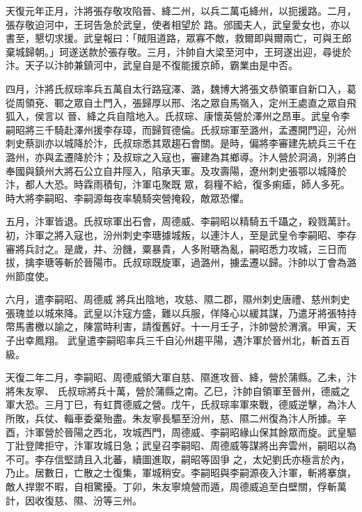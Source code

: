 \begin{pinyinscope}
 天復元年正月，汴將張存敬攻陷晉、絳二州，以兵二萬屯絳州，以扼援路。二月，張存敬迫河中，王珂告急於武皇，使者相望於
 路。邠國夫人，武皇愛女也，亦以書至，懇切求援。武皇報曰：「賊阻道路，眾寡不敵，救爾即與爾兩亡，可與王郎棄城歸朝。」珂遂送款於張存敬。三月，汴帥自大梁至河中，王珂遂出迎，尋徙於汴。天子以汴帥兼鎮河中，武皇自是不復能援京師，霸業由是中否。



 四月，汴將氏叔琮率兵五萬自太行路寇澤、潞，魏博大將張文恭領軍自新口入，葛從周領兗、鄆之眾自土門入，張歸厚以邢、洺之眾自馬嶺入，定州王處直之眾自飛狐入，侯言以
 晉、絳之兵自陰地入。氏叔琮、康懷英營於澤州之昂車。武皇令李嗣昭將三千騎赴澤州援李存璋，而歸賀德倫。氏叔琮軍至潞州，孟遷開門迎，沁州刺史蔡訓亦以城降於汴，氏叔琮悉其眾趨石會關。是時，偏將李審建先統兵三千在潞州，亦與孟遷降於汴；及叔琮之入寇也，審建為其鄉導。汴人營於洞渦，別將白奉國與鎮州大將石公立自井陘入，陷承天軍。及攻壽陽，遼州刺史張鄂以城降於汴，都人大恐。時霖雨積旬，汴軍屯聚既
 眾，芻糧不給，復多痢瘧，師人多死。時大將李嗣昭、李嗣源每夜率驍騎突營掩殺，敵眾恐懼。



 五月，汴軍皆退。氏叔琮軍出石會，周德威、李嗣昭以精騎五千躡之，殺戮萬計。初，汴軍之將入寇也，汾州刺史李瑭據城叛，以連汴人，至是武皇令李嗣昭、李存審將兵討之。是歲，并、汾饑，粟暴貴，人多附瑭為亂，嗣昭悉力攻城，三日而拔，擒李瑭等斬於晉陽市。氏叔琮既旋軍，過潞州，擄孟遷以歸。汴帥以丁會為潞州節度使。


六月，遣李嗣昭、周德威
 將兵出陰地，攻慈、隰二郡，隰州刺史唐禮、慈州刺史張瑰並以城來降。武皇以汴寇方盛，難以兵服，佯降心以緩其謀，乃遣牙將張特持幣馬書檄以諭之，陳當時利害，請復舊好。十一月壬子，汴帥營於渭濱。甲寅，天子出幸鳳翔。
 武皇遣李嗣昭率兵三千自沁州趨平陽，遇汴軍於晉州北，斬首五百級。



 天復二年二月，李嗣昭、周德威領大軍自慈、隰進攻晉、絳，營於蒲縣。乙未，汴將朱友寧、
 氏叔琮將兵十萬，營於蒲縣之南。乙巳，汴帥自領軍至晉州，德威之軍大恐。三月丁巳，有虹貫德威之營。戊午，氏叔琮率軍來戰，德威逆擊，為汴人所敗，兵仗、輜車委棄殆盡。朱友寧長驅至汾州，慈、隰二州復為汴人所據。辛酉，汴軍營於晉陽之西北，攻城西門，周德威、李嗣昭緣山保其餘眾而旋。武皇驅丁壯登陴拒守，汴軍攻城日急；武皇召李嗣昭、周德威等謀將出奔雲州，嗣昭以為不可。李存信堅請且入北蕃，續圖進取，嗣昭等固爭
 之，太妃劉氏亦極言於內，乃止。居數日，亡散之士復集，軍城稍安。李嗣昭與李嗣源夜入汴軍，斬將搴旗，敵人捍禦不暇，自相驚擾。丁卯，朱友寧燒營而遁，周德威追至白壁關，俘斬萬計，因收復慈、隰、汾等三州。




\end{pinyinscope}

